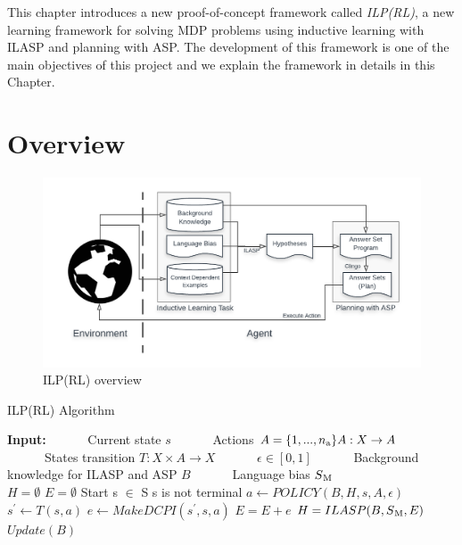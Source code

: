 This chapter introduces a new proof-of-concept framework called \textit{ILP(RL)}, a new learning framework for solving MDP problems using inductive learning with ILASP and planning with ASP.
The development of this framework is one of the main objectives of this project and we explain the framework in details in this Chapter.

\section{Overview}
\label{sec:overview}

\begin{figure}[!htb]
\centering
\includegraphics[width=1.0\textwidth]{./figures/architecture}
\caption{ILP(RL) overview}
\label{fig:ILPRL_overview}
\end{figure}

\begin{algorithm}
\caption{ILP(RL) Algorithm}
\begin{algorithmic}[1]
\label{algo:ILPRL}
\renewcommand{\algorithmicrequire}{\textbf{Input:}}
\State \textbf{Input:}
\State \ \ \ \ \ \ Current state $s$
\State \ \ \ \ \ \ Actions $A = \{ 1, ..., n\textsubscript{a}\} A: X \rightarrow A$
\State \ \ \ \ \ \ States transition $T: X \times A \rightarrow X$
\State \ \ \ \ \ \ $\epsilon \in [0,1]$
\State \ \ \ \ \ \ Background knowledge for ILASP and ASP $B$
\State \ \ \ \ \ \ Language bias $S\textsubscript{M}$ \\

\State $H = \emptyset$
\State $E = \emptyset$
\State Start s $\in$ S
\While s is not terminal 
\State $a \leftarrow POLICY(B, H, s, A, \epsilon)$ \\
\space
{}
\State $s^\prime \leftarrow T(s,a)$
\space
{}
\State $e \leftarrow MakeDCPI(s^\prime, s, a) $ 
\State $E = E + e$
\space
{}
\State $H = ILASP(B, S\textsubscript{M}, E)$
\EndIf
\State $Update(B)$
\EndWhile
\EndProcedure
\end{algorithmic}
\end{algorithm}


